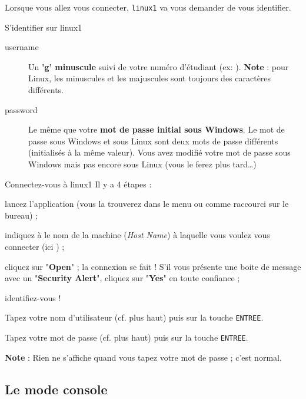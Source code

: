 \documentclass[a4paper,11pt]{style-esi/td}
\begin{document}
	Lorsque vous allez vous connecter, \verb_linux1_ va vous demander de vous identifier.

	\begin{infotbox}{S'identifier sur linux1}
		\begin{description}
		\item[username]
			Un \textbf{'g' minuscule} suivi de votre numéro d'étudiant
			(ex: ).
			\textbf{Note} : pour Linux, les minuscules et les majuscules 
			sont toujours des caractères différents.
		\item[password]
			Le même que votre \textbf{mot de passe initial sous Windows}.			
			Le mot de passe sous Windows et sous Linux sont deux mots de passe différents 
			(initialisés à la même valeur).        
			Vous avez modifié votre mot de passe sous Windows 
			mais pas encore sous Linux (vous le ferez plus tard\dots)
		\end{description}
	\end{infotbox}

	\begin{Tutoriel}{Connectez-vous à linux1} 
	Il y a 4 étapes :
	\begin{steps}			
	\item 
		lancez l'application  
		(vous la trouverez dans le menu ou comme raccourci sur le bureau) ;				
	\item 
		indiquez à  le nom de la machine (\textit{Host Name}) 
		à laquelle vous voulez vous connecter (ici ) ;
	\item 
		cliquez sur "\textbf{Open}" ; 
		la connexion se fait ! 
		S'il vous présente une boite de message avec un "\textbf{Security Alert}", 
		cliquez sur "\textbf{Yes}" en toute confiance ;				
	\item 
		identifiez-vous !
		\begin{steps}
		\item 
			Tapez votre nom d'utilisateur (cf. plus haut) 
			puis sur la touche \verb_ENTREE_. 
		\item 
			Tapez votre mot de passe (cf. plus haut) puis sur la touche \verb_ENTREE_.
			\par
			\textbf{Note} : Rien ne s'affiche quand vous tapez votre mot de passe ; c'est normal.
		\end{steps}
	\end{steps}
	\end{Tutoriel}

\subsection{Le mode console}
\end{document}
